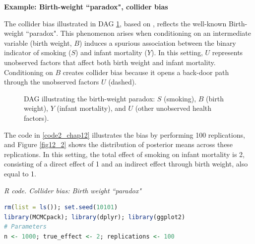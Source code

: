\textbf{Example: Birth-weight ``paradox", collider bias}

The collider bias illustrated in DAG \ref{fig:coll}, based on \cite{chernozhukov2024applied}, reflects the well-known Birth-weight ``paradox". This phenomenon arises when conditioning on an intermediate variable (birth weight, $B$) induces a spurious association between the binary indicator of smoking ($S$) and infant mortality ($Y$). In this setting, $U$ represents unobserved factors that affect both birth weight and infant mortality. Conditioning on $B$ creates collider bias because it opens a back-door path through the unobserved factors $U$ (dashed).

\begin{figure}[h!]
	\centering
	\caption{DAG illustrating the birth-weight paradox: $S$ (smoking), $B$ (birth weight), $Y$ (infant mortality), and $U$ (other unobserved health factors).}
	\label{fig:coll}
\end{figure}	

The code in \ref{code2_chap12} illustrates the bias by performing 100 replications, and Figure \ref{fig12_2} shows the distribution of posterior means across these replications. In this setting, the total effect of smoking on infant mortality is 2, consisting of a direct effect of 1 and an indirect effect through birth weight, also equal to 1.

\begin{tcolorbox}[enhanced,width=4.67in,center upper,
	fontupper=\large\bfseries,drop shadow southwest,sharp corners]\label{code2_chap12}
	\textit{R code. Collider bias: Birth weight ``paradox"}
	\begin{VF}
		\begin{lstlisting}[language=R]		
rm(list = ls()); set.seed(10101)
library(MCMCpack); library(dplyr); library(ggplot2)
# Parameters
n <- 1000; true_effect <- 2; replications <- 100
\end{lstlisting}
	\end{VF}
\end{tcolorbox}  

